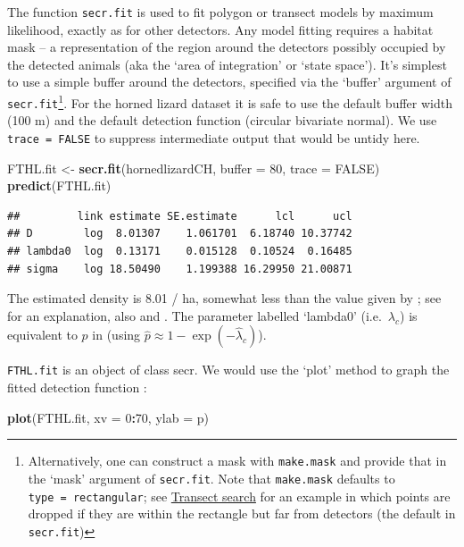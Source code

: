 \documentclass[
]{book}
\newenvironment{Shaded}{\begin{snugshade}}{\end{snugshade}}
\newcommand{\AttributeTok}[1]{\textcolor[rgb]{0.13,0.29,0.53}{#1}}
\newcommand{\ConstantTok}[1]{\textcolor[rgb]{0.56,0.35,0.01}{#1}}
\newcommand{\DecValTok}[1]{\textcolor[rgb]{0.00,0.00,0.81}{#1}}
\newcommand{\FunctionTok}[1]{\textcolor[rgb]{0.13,0.29,0.53}{\textbf{#1}}}
\newcommand{\NormalTok}[1]{#1}
\newcommand{\OtherTok}[1]{\textcolor[rgb]{0.56,0.35,0.01}{#1}}
\newcommand{\SpecialCharTok}[1]{\textcolor[rgb]{0.81,0.36,0.00}{\textbf{#1}}}
\newcommand{\StringTok}[1]{\textcolor[rgb]{0.31,0.60,0.02}{#1}}
\begin{document}
The function \texttt{secr.fit} is used to fit polygon or transect models by maximum likelihood, exactly as for other detectors. Any model fitting requires a habitat mask -- a representation of the region around the detectors possibly occupied by the detected animals (aka the `area of integration' or `state space'). It's simplest to use a simple buffer around the detectors, specified via the `buffer' argument of \texttt{secr.fit}\footnote{Alternatively, one can construct a mask with \texttt{make.mask} and provide that in the `mask' argument of \texttt{secr.fit}. Note that \texttt{make.mask} defaults to \texttt{type\ =\ \textquotesingle{}rectangular\textquotesingle{}}; see \hyperref[transectsearch]{Transect search} for an example in which points are dropped if they are within the rectangle but far from detectors (the default in \texttt{secr.fit})}. For the horned lizard dataset it is safe to use the default buffer width (100 m) and the default detection function (circular bivariate normal). We use \texttt{trace\ =\ FALSE} to suppress intermediate output that would be untidy here.

\begin{Shaded}
\begin{Highlighting}[]
\NormalTok{FTHL.fit }\OtherTok{\textless{}{-}} \FunctionTok{secr.fit}\NormalTok{(hornedlizardCH, }\AttributeTok{buffer =} \DecValTok{80}\NormalTok{, }\AttributeTok{trace =} \ConstantTok{FALSE}\NormalTok{)}
\FunctionTok{predict}\NormalTok{(FTHL.fit)}
\end{Highlighting}
\end{Shaded}

\begin{verbatim}
##         link estimate SE.estimate      lcl      ucl
## D        log  8.01307    1.061701  6.18740 10.37742
## lambda0  log  0.13171    0.015128  0.10524  0.16485
## sigma    log 18.50490    1.199388 16.29950 21.00871
\end{verbatim}

The estimated density is 8.01 / ha, somewhat less than the value given by \citet{ry08}; see \citet{e11} for an explanation, also \citet{mtr11} and \citet{d13}. The parameter labelled `lambda0' (i.e.~\(\lambda_c\)) is equivalent to \(p\) in \citet{ry08} (using \(\hat p \approx 1 - \exp(-\hat \lambda_c)\)).

\texttt{FTHL.fit} is an object of class secr. We would use the `plot' method to graph the fitted detection function :

\begin{Shaded}
\begin{Highlighting}[]
\FunctionTok{plot}\NormalTok{(FTHL.fit, }\AttributeTok{xv =} \DecValTok{0}\SpecialCharTok{:}\DecValTok{70}\NormalTok{, }\AttributeTok{ylab =} \StringTok{\textquotesingle{}p\textquotesingle{}}\NormalTok{)}
\end{Highlighting}
\end{Shaded}
\end{document}
